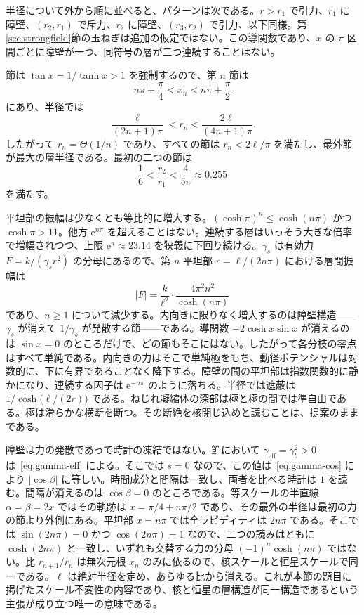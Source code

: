 \documentclass[a4paper]{article}
\begin{document}
半径について外から順に並べると、パターンは次である。\(r>r_1\) で引力、\(r_1\) に障壁、\((r_2,r_1)\) で斥力、\(r_2\) に障壁、\((r_3,r_2)\) で引力、以下同様。第\ref{sec:strongfield}節の玉ねぎは追加の仮定ではない。この導関数であり、\(x\) の \(\pi\) 区間ごとに障壁が一つ、同符号の層が二つ連続することはない。

節は \(\tan x=1/\tanh x>1\) を強制するので、第 \(n\) 節は
\[
n\pi+\frac{\pi}{4}<x_n<n\pi+\frac{\pi}{2}
\]
にあり、半径では
\[
\frac{\ell}{(2n+1)\pi}<r_n<\frac{2\ell}{(4n+1)\pi}.
\]
したがって \(r_n=\Theta(1/n)\) であり、すべての節は \(r_n<2\ell/\pi\) を満たし、最外節が最大の層半径である。最初の二つの節は
\[
\frac16<\frac{r_2}{r_1}<\frac{4}{5\pi}\approx 0.255
\]
を満たす。

平坦部の振幅は少なくとも等比的に増大する。\((\cosh\pi)^n\le\cosh(n\pi)\) かつ \(\cosh\pi>11\)。他方 \(\mathrm{e}^{n\pi}\) を超えることはない。連続する層はいっそう大きな倍率で増幅されつつ、上限 \(\mathrm{e}^\pi\approx 23.14\) を狭義に下回り続ける。\(\gamma_s\) は有効力 \(F=k/(\gamma_s r^2)\) の分母にあるので、第 \(n\) 平坦部 \(r=\ell/(2n\pi)\) における層間振幅は
\[
|F|=\frac{k}{\ell^2}\cdot\frac{4\pi^2n^2}{\cosh(n\pi)}
\]
であり、\(n\ge 1\) について減少する。内向きに限りなく増大するのは障壁構造——\(\gamma_s\) が消えて \(1/\gamma_s\) が発散する節——である。導関数 \(-2\cosh x\sin x\) が消えるのは \(\sin x=0\) のところだけで、どの節もそこにはない。したがって各分枝の零点はすべて単純である。内向きの力はそこで単純極をもち、動径ポテンシャルは対数的に、下に有界であることなく降下する。障壁の間の平坦部は指数関数的に静かになり、連続する因子は \(\mathrm{e}^{-n\pi}\) のように落ちる。半径では遮蔽は \(1/\cosh\bigl(\ell/(2r)\bigr)\) である。ねじれ凝縮体の深部は極と極の間では準自由である。極は滑らかな横断を断つ。その断絶を核閉じ込めと読むことは、提案のままである。

障壁は力の発散であって時計の凍結ではない。節において \(\gamma_{\mathrm{eff}}=\gamma_b^2>0\) は~\eqref{eq:gamma-eff} による。そこでは \(s=0\) なので、この値は~\eqref{eq:gamma-cos} により \(|\cos\beta|\) に等しい。時間成分と間隔は一致し、両者を比べる時計は \(1\) を読む。間隔が消えるのは \(\cos\beta=0\) のところである。等スケールの半直線 \(\alpha=\beta=2x\) ではその軌跡は \(x=\pi/4+n\pi/2\) であり、その最外の半径は最初の力の節より外側にある。平坦部 \(x=n\pi\) では全ラピディティは \(2n\pi\) である。そこでは \(\sin(2n\pi)=0\) かつ \(\cos(2n\pi)=1\) なので、二つの読みはともに \(\cosh(2n\pi)\) と一致し、いずれも交替する力の分母 \((-1)^n\cosh(n\pi)\) ではない。比 \(r_{n+1}/r_n\) は無次元根 \(x_n\) のみに依るので、核スケールと恒星スケールで同一である。\(\ell\) は絶対半径を定め、あらゆる比から消える。これが本節の題目に掲げたスケール不変性の内容であり、核と恒星の層構造が同一構造であるという主張が成り立つ唯一の意味である。
\end{document}
